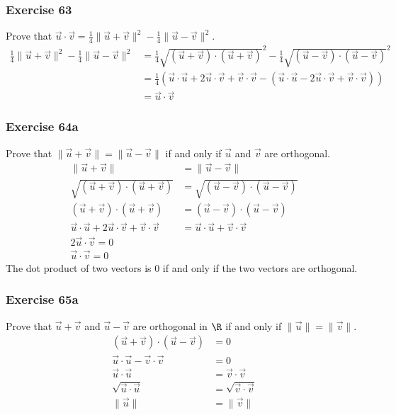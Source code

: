\documentclass[letterpaper, 12pt]{math}
\begin{document}
\subsubsection*{Exercise 63}
Prove that \( \vec{u}\cdot\vec{v} = \frac{1}{4}\|\vec{u}+\vec{v}\|^2-
\frac{1}{4}\|\vec{u}-\vec{v}\|^2 \).
\begin{align*}
  \frac{1}{4}\|\vec{u}+\vec{v}\|^2-\frac{1}{4}\|\vec{u}-\vec{v}\|^2 &=
    \frac{1}{4}\sqrt{(\vec{u}+\vec{v})\cdot(\vec{u}+\vec{v})}^2-
    \frac{1}{4}\sqrt{(\vec{u}-\vec{v})\cdot(\vec{u}-\vec{v})}^2 \\
  &= \frac{1}{4}(\vec{u}\cdot\vec{u}+2\vec{u}\cdot\vec{v}+\vec{v}\cdot\vec{v}-
    (\vec{u}\cdot\vec{u}-2\vec{u}\cdot\vec{v}+\vec{v}\cdot\vec{v})) \\
  &= \vec{u}\cdot\vec{v}
\end{align*}

\subsubsection*{Exercise 64a}
Prove that \( \|\vec{u}+\vec{v}\| = \|\vec{u}-\vec{v}\| \) if and only if
\( \vec{u} \) and \( \vec{v} \) are orthogonal.
\begin{align*}
  \|\vec{u}+\vec{v}\| &= \|\vec{u}-\vec{v}\| \\
  \sqrt{(\vec{u}+\vec{v})\cdot(\vec{u}+\vec{v})} &=
    \sqrt{(\vec{u}-\vec{v})\cdot(\vec{u}-\vec{v})} \\
  (\vec{u}+\vec{v})\cdot(\vec{u}+\vec{v}) &=
    (\vec{u}-\vec{v})\cdot(\vec{u}-\vec{v}) \\
  \vec{u}\cdot\vec{u}+2\vec{u}\cdot\vec{v}+\vec{v}\cdot\vec{v} &=
    \vec{u}\cdot\vec{u}+\vec{v}\cdot\vec{v} \\
  2\vec{u}\cdot\vec{v} = 0 \\
  \vec{u}\cdot\vec{v} = 0
\end{align*}
The dot product of two vectors is 0 if and only if the two vectors are
orthogonal.

\subsubsection*{Exercise 65a}
Prove that \( \vec{u}+\vec{v} \) and \( \vec{u}-\vec{v} \) are orthogonal in
\( \R \) if and only if \( \|\vec{u}\| = \|\vec{v}\| \).
\begin{align*}
  (\vec{u}+\vec{v})\cdot(\vec{u}-\vec{v}) &= 0 \\
  \vec{u}\cdot\vec{u}-\vec{v}\cdot\vec{v} &= 0 \\
  \vec{u}\cdot\vec{u} &= \vec{v}\cdot\vec{v} \\
  \sqrt{\vec{u}\cdot\vec{u}} &= \sqrt{\vec{v}\cdot\vec{v}} \\
  \|\vec{u}\| &= \|\vec{v}\|
\end{align*}
\end{document}
